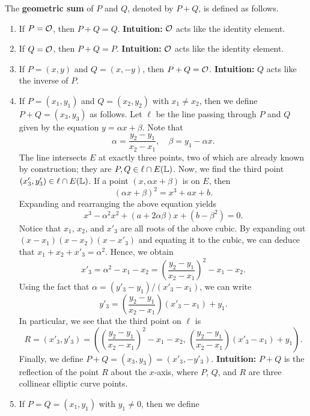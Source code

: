 \begin{defn}
    The {\bf geometric sum} of $P$ and $Q$, denoted by $P + Q$, is defined 
    as follows. 
    \begin{enumerate}[(1)]
        \item If $P = {\cal O}$, then $P + Q = Q$. \textbf{Intuition:} ${\cal O}$ 
        acts like the identity element. 
        \item If $Q = {\cal O}$, then $P + Q = P$. \textbf{Intuition:} ${\cal O}$ 
        acts like the identity element. 
        \item If $P = (x, y)$ and $Q = (x, -y)$, then $P + Q = {\cal O}$.
        \textbf{Intuition:} $Q$ acts like the inverse of $P$. 
        \item If $P = (x_1, y_1)$ and $Q = (x_2, y_2)$ with $x_1 \neq x_2$, then 
        we define $P + Q = (x_3, y_3)$ as follows. Let $\ell$ be the line 
        passing through $P$ and $Q$ given by the equation $y = \alpha x + \beta$. 
        Note that 
        \[ \alpha = \frac{y_2 - y_1}{x_2 - x_1}, \quad \beta = y_1 - \alpha x. \] 
        The line intersects $E$ at exactly three points, two of which are 
        already known by construction; they are $P, Q \in \ell \cap E(\mathbb{L})$. 
        Now, we find the third point $(x'_3, y'_3) \in \ell \cap E(\mathbb{L})$. 
        If a point $(x, \alpha x + \beta)$ is on $E$, then 
        \[ (\alpha x + \beta)^2 = x^3 + ax + b. \] 
        Expanding and rearranging the above equation yields 
        \[ x^3 - \alpha^2 x^2 + (a + 2\alpha\beta)x + (b - \beta^2) = 0. \]
        Notice that $x_1$, $x_2$, and $x'_3$ are all roots of the above 
        cubic. By expanding out $(x - x_1)(x - x_2)(x - x'_3)$ and equating 
        it to the cubic, we can deduce that $x_1 + x_2 + x'_3 = \alpha^2$. 
        Hence, we obtain 
        \[ x'_3 = \alpha^2 - x_1 - x_2 = \left( \frac{y_2 - y_1}{x_2 - x_1} \right)^{\!2} - x_1 - x_2. \] 
        Using the fact that $\alpha = (y'_3 - y_1)/(x'_3 - x_1)$, we can write 
        \[ y'_3 = \left( \frac{y_2 - y_1}{x_2 - x_1} \right)(x'_3 - x_1) + y_1. \] 
        In particular, we see that the third point on $\ell$ is 
        \[ R = (x'_3, y'_3) = \left( \left( \frac{y_2 - y_1}{x_2 - x_1} \right)^{\!2} - x_1 - x_2,\,
        \left( \frac{y_2 - y_1}{x_2 - x_1} \right)(x'_3 - x_1) + y_1 \right). \] 
        Finally, we define $P + Q = (x_3, y_3) = (x'_3, -y'_3)$. 
        \textbf{Intuition:} $P + Q$ is the reflection of the point $R$ 
        about the $x$-axis, where $P$, $Q$, and $R$ are three collinear 
        elliptic curve points. 
        \item If $P = Q = (x_1, y_1)$ with $y_1 \neq 0$, then we define 

\end{enumerate}
\end{defn}

